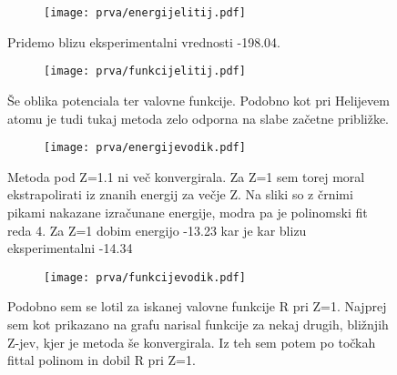 \documentclass{article}
\begin{document}
\begin{figure}[H]
\centering
\begin{subfigure}{.6\textwidth}
\texttt{[image: prva/energijelitij.pdf]}
\end{subfigure}
\caption*{Pridemo blizu eksperimentalni vrednosti -198.04.}
\end{figure}

\begin{figure}[H]
\centering
\begin{subfigure}{.6\textwidth}
\texttt{[image: prva/funkcijelitij.pdf]}
\end{subfigure}
\caption*{Še oblika potenciala ter valovne funkcije. Podobno kot pri Helijevem atomu je tudi tukaj metoda zelo odporna na slabe začetne približke.}
\end{figure}


\begin{figure}[H]
\centering
\begin{subfigure}{.6\textwidth}
\texttt{[image: prva/energijevodik.pdf]}
\end{subfigure}
\caption*{Metoda pod Z=1.1 ni več konvergirala. Za Z=1 sem torej moral ekstrapolirati iz znanih energij za večje Z. Na sliki so z črnimi pikami nakazane izračunane energije, modra pa je polinomski fit reda 4. Za Z=1 dobim energijo -13.23 kar je kar blizu eksperimentalni -14.34}
\end{figure}

\begin{figure}[H]
\centering
\begin{subfigure}{.6\textwidth}
\texttt{[image: prva/funkcijevodik.pdf]}
\end{subfigure}
\caption*{Podobno sem se lotil za iskanej valovne funkcije R pri Z=1. Najprej sem kot prikazano na grafu narisal funkcije za nekaj drugih, bližnjih Z-jev, kjer je metoda še konvergirala. Iz teh sem potem po točkah fittal polinom in dobil R pri Z=1.}
\end{figure}
\end{document}
